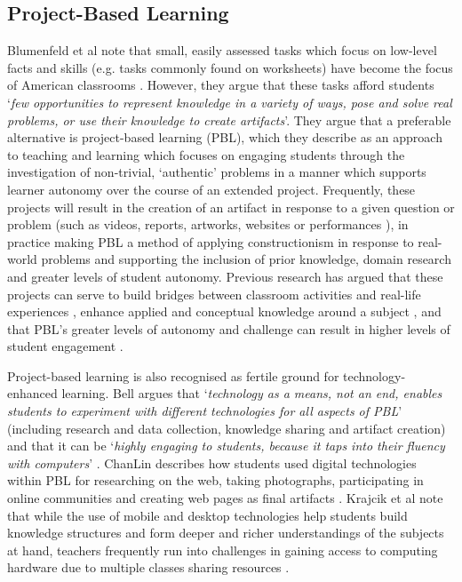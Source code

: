 \documentclass{sigchi}
\begin{document}
\subsection{Project-Based Learning}
Blumenfeld et al note that small, easily assessed tasks which focus on low-level facts and skills (e.g. tasks commonly found on worksheets) have become the focus of American classrooms \cite{Blumenfeld1991}. However, they argue that these tasks afford students `\textit{few opportunities to represent knowledge in a variety of ways, pose and solve real problems, or use their knowledge to create artifacts}'. They argue that a preferable alternative is project-based learning (PBL), which they describe as an approach to teaching and learning which focuses on engaging students through the investigation of non-trivial, `authentic' problems in a manner which supports learner autonomy over the course of an extended project. Frequently, these projects will result in the creation of an artifact in response to a given question or problem (such as videos, reports, artworks, websites or performances \cite{Holubova2008}), in practice making PBL a method of applying constructionism in response to real-world problems and supporting the inclusion of prior knowledge, domain research and greater levels of student autonomy. Previous research has argued that these projects can serve to build bridges between classroom activities and real-life experiences \cite{Blumenfeld1991}, enhance applied and conceptual knowledge around a subject \cite{Boaler1999}, and that PBL's greater levels of autonomy and challenge can result in higher levels of student engagement \cite{Wurdinger2007}.

Project-based learning is also recognised as fertile ground for technology-enhanced learning. Bell argues that `\textit{technology as a means, not an end, enables students to experiment with different technologies for all aspects of PBL}' (including research and data collection, knowledge sharing and artifact creation) and that it can be `\textit{highly engaging to students, because it taps into their fluency with computers}' \cite{Bell2010}. ChanLin describes how students used digital technologies within PBL for researching on the web, taking photographs, participating in online communities and creating web pages as final artifacts \cite{ChanLin2008}. Krajcik et al note that while the use of mobile and desktop technologies help students build knowledge structures and form deeper and richer understandings of the subjects at hand, teachers frequently run into challenges in gaining access to computing hardware due to multiple classes sharing resources \cite{Krajcik2006}.
\end{document}
